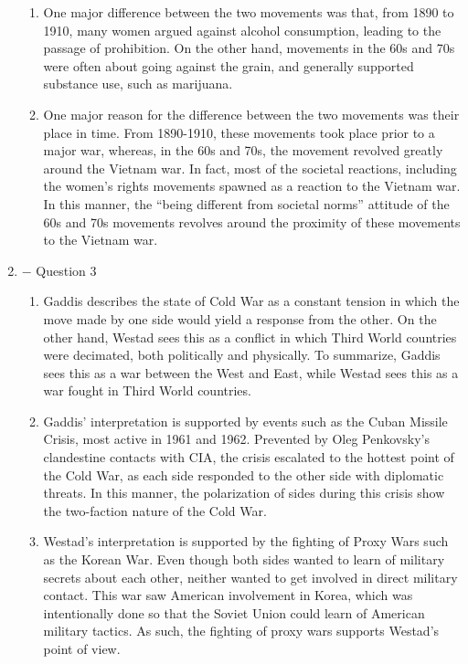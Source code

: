 \documentclass[12pt]{article}
\begin{document}
\begin{enumerate}
\begin{enumerate}
      \item One major difference between the two movements was that, from 1890 to 1910, many women argued against alcohol consumption, leading to the passage of prohibition. On the other hand, movements in the 60s and 70s were often about going against the grain, and generally supported substance use, such as marijuana.

      \item One major reason for the difference between the two movements was their place in time. From 1890-1910, these movements took place prior to a major war, whereas, in the 60s and 70s, the movement revolved greatly around the Vietnam war. In fact, most of the societal reactions, including the women's rights movements spawned as a reaction to the Vietnam war. In this manner, the “being different from societal norms” attitude of the 60s and 70s movements revolves around the proximity of these movements to the Vietnam war.

    \end{enumerate}

    \newpage

  \item $-$ Question 3

    \begin{enumerate}

      \item Gaddis describes the state of Cold War as a constant tension in which the move made by one side would yield a response from the other. On the other hand, Westad sees this as a conflict in which Third World countries were decimated, both politically and physically. To summarize, Gaddis sees this as a war between the West and East, while Westad sees this as a war fought in Third World countries.

      \item Gaddis' interpretation is supported by events such as the Cuban Missile Crisis, most active in 1961 and 1962. Prevented by Oleg Penkovsky's clandestine contacts with CIA, the crisis escalated to the hottest point of the Cold War, as each side responded to the other side with diplomatic threats. In this manner, the polarization of sides during this crisis show the two-faction nature of the Cold War.

      \item Westad's interpretation is supported by the fighting of Proxy Wars such as the Korean War. Even though both sides wanted to learn of military secrets about each other, neither wanted to get involved in direct military contact. This war saw American involvement in Korea, which was intentionally done so that the Soviet Union could learn of American military tactics. As such, the fighting of proxy wars supports Westad's point of view.

    \end{enumerate}

\end{enumerate}
\end{document}
